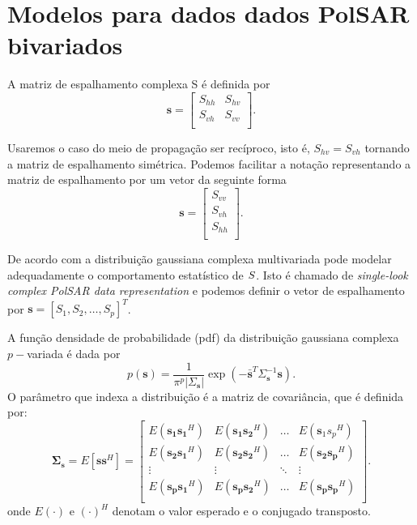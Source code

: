 \section{Modelos para dados dados PolSAR bivariados}

A matriz de espalhamento complexa {\boldmath S} é definida por
$$
\mathbf{ s} = \left[
\begin{array}{cc}
	S_{hh}   & S_{hv}   \\
	S_{vh}   & S_{vv}   \\
\end{array}
\right].
$$

Usaremos o caso do meio de propagação ser recíproco, isto é, $S_{hv}=S_{vh}$ tornando a matriz de espalhamento simétrica. Podemos facilitar a notação representando a matriz de espalhamento por um vetor da seguinte forma
$$
\mathbf{s} = \left[
\begin{array}{c}
	S_{vv}      \\
	S_{vh}     \\
	S_{hh}      \\
\end{array}
\right].
$$

De acordo com \cite{good} a distribuição gaussiana complexa multivariada pode modelar adequadamente o comportamento estatístico de $\boldmath S$. Isto é chamado de {\it single-look complex PolSAR data representation} e podemos definir o vetor de espalhamento por $\mathbf{s}=[S_1,S_2,\dots,S_p]^T$. 

A função densidade de probabilidade ({\boldmath pdf}) da distribuição gaussiana complexa $p-$variada é dada por
\begin{equation}\label{eqn1}
	p(\mathbf{s})=\frac{1}{\pi^p|\Sigma_{\mathbf{s}}|}\exp(-\bar{\mathbf{s}}^{T}\Sigma_{\mathbf{s}}^{-1}\mathbf{s}).
\end{equation}
O parâmetro que indexa a distribuição é a matriz de covariância, que é definida por:
\begin{equation}\label{eqn2}
	\mathbf{ \Sigma_{s}} = E[\mathbf{ss}^H] = \left[
\begin{array}{cccc}
	E(\mathbf{s_1s_1}^H)  & E(\mathbf{s_1s_2}^H) &\hdots & E({\mathbf s_1s_p}^H) \\
	E(\mathbf{ s_2s_1}^H)  & E(\mathbf {s_2 s_2}^H) &\hdots &E(\mathbf {s_2 s_p}^H)\\
        \vdots&\vdots &\ddots &\vdots\\
	E(\mathbf{ s_ps_1}^H)  & E(\mathbf {s_ps_2}^H) &\hdots &E(\mathbf {s_ps_p}^H)\\
\end{array}
\right].
\end{equation}
onde $E(\cdot)$ e $(\cdot)^H$ denotam o valor esperado e o conjugado transposto.

